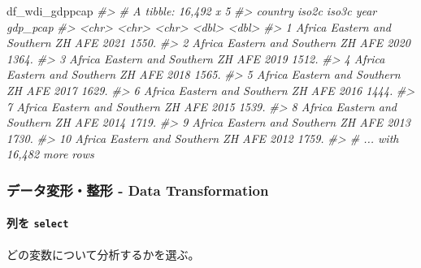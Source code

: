 \documentclass[
]{bxjsbook}
\newenvironment{Shaded}{\begin{snugshade}}{\end{snugshade}}
\newcommand{\CommentTok}[1]{\textcolor[rgb]{0.56,0.35,0.01}{\textit{#1}}}
\newcommand{\NormalTok}[1]{#1}
\theoremstyle{definition}
\theoremstyle{definition}
\theoremstyle{definition}
\theoremstyle{definition}
\theoremstyle{remark}
\begin{document}
\begin{Shaded}
\begin{Highlighting}[]
\NormalTok{df\_wdi\_gdppcap}
\CommentTok{\#\textgreater{} \# A tibble: 16,492 x 5}
\CommentTok{\#\textgreater{}    country                     iso2c iso3c  year gdp\_pcap}
\CommentTok{\#\textgreater{}    \textless{}chr\textgreater{}                       \textless{}chr\textgreater{} \textless{}chr\textgreater{} \textless{}dbl\textgreater{}    \textless{}dbl\textgreater{}}
\CommentTok{\#\textgreater{}  1 Africa Eastern and Southern ZH    AFE    2021    1550.}
\CommentTok{\#\textgreater{}  2 Africa Eastern and Southern ZH    AFE    2020    1364.}
\CommentTok{\#\textgreater{}  3 Africa Eastern and Southern ZH    AFE    2019    1512.}
\CommentTok{\#\textgreater{}  4 Africa Eastern and Southern ZH    AFE    2018    1565.}
\CommentTok{\#\textgreater{}  5 Africa Eastern and Southern ZH    AFE    2017    1629.}
\CommentTok{\#\textgreater{}  6 Africa Eastern and Southern ZH    AFE    2016    1444.}
\CommentTok{\#\textgreater{}  7 Africa Eastern and Southern ZH    AFE    2015    1539.}
\CommentTok{\#\textgreater{}  8 Africa Eastern and Southern ZH    AFE    2014    1719.}
\CommentTok{\#\textgreater{}  9 Africa Eastern and Southern ZH    AFE    2013    1730.}
\CommentTok{\#\textgreater{} 10 Africa Eastern and Southern ZH    AFE    2012    1759.}
\CommentTok{\#\textgreater{} \# ... with 16,482 more rows}
\end{Highlighting}
\end{Shaded}

\hypertarget{ux30c7ux30fcux30bfux5909ux5f62ux6574ux5f62---data-transformation}{%
\subsubsection{データ変形・整形 - Data Transformation}\label{ux30c7ux30fcux30bfux5909ux5f62ux6574ux5f62---data-transformation}}

\hypertarget{ux5217ux3092-select}{%
\paragraph{\texorpdfstring{列を \texttt{select}}{列を select}}\label{ux5217ux3092-select}}

どの変数について分析するかを選ぶ。
\end{document}
